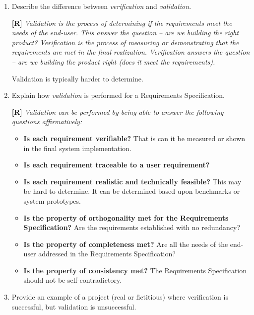 \begin{enumerate}
  \item
    Describe the difference between \emph{verification} and  \emph{validation}.
    
\begin{onlysolution}
 \textbf{[R]}
 \itshape
Validation is the process of determining if the requirements meet the
needs of the end-user. This answer the question -- are we building the
right product? Verification is the process of measuring or demonstrating
that the requirements are met in the final realization. Verification
answers the question -- are we building the product right (does it meet
the requirements).

Validation is typically harder to determine.
\end{onlysolution}    
    
    
    
    
  \item
    Explain how \emph{validation} is performed for a Requirements Specification.
    
\begin{onlysolution}
  \textbf{[R]}
   \itshape
Validation can be performed by being able to answer the following
questions affirmatively:

\begin{itemize}
\item \textbf{Is each requirement verifiable?} That is can it be measured or
shown in the final system implementation.
\item \textbf{Is each requirement traceable to a user requirement?}
\item \textbf{Is each requirement realistic and technically feasible?} This
may be hard to determine. It can be determined based upon benchmarks or
system prototypes.
\item \textbf{Is the property of orthogonality met for the Requirements
Specification?} Are the requirements established with no redundancy?
\item \textbf{Is the property of completeness met?} Are all the needs of the
end-user addressed in the Requirements Specification?
\item \textbf{Is the property of consistency met?} The Requirements
Specification should not be self-contradictory.
\end{itemize}
\end{onlysolution}    
    
  \item
    Provide an example of a project (real or fictitious) where
    verification is successful, but validation is unsuccessful.
    

\end{enumerate}
